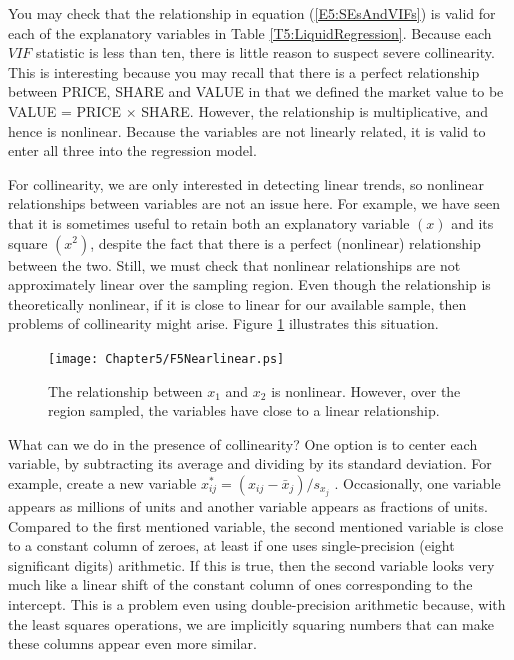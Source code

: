 You may check that the relationship in equation
(\ref{E5:SEsAndVIFs}) is valid for each of the explanatory variables
in Table \ref{T5:LiquidRegression}. Because each $VIF$ statistic is
less than ten, there is little reason to suspect severe
collinearity. This is interesting because you may recall that there
is a perfect relationship between PRICE, SHARE and VALUE in that we
defined the market value to be VALUE = PRICE $\times $ SHARE.
However, the relationship is multiplicative, and hence is nonlinear.
Because the variables are not linearly related, it is valid to enter
all three into the regression model.

\linejed

For collinearity, we are only interested in detecting linear trends,
so nonlinear relationships between variables are not an issue here.
For example, we have seen that it is sometimes useful to retain both
an explanatory variable $(x)$ and its square $(x^2)$, despite the
fact that there is a perfect (nonlinear) relationship between the
two. Still, we must check that nonlinear relationships are not
approximately linear over the sampling region. Even though the
relationship is theoretically nonlinear, if it is close to linear
for our available sample, then problems of collinearity might arise.
Figure \ref{F5:Nearlinear} illustrates this situation.


\begin{figure}[htp]
  \begin{center}
    \texttt{[image: Chapter5/F5Nearlinear.ps]}
    \caption{\label{F5:Nearlinear} \small  The relationship
between $x_1$ and $x_2$ is nonlinear. However, over the region
sampled, the variables have close to a linear relationship.}
  \end{center}
\end{figure}



What can we do in the presence of collinearity? One option is to center each
variable, by subtracting its average and dividing by its standard deviation.
For example, create a new variable $x_{ij}^{\ast }=(x_{ij}-\bar{x}%
_j)/s_{x_j}$ . Occasionally, one variable appears as millions of
units and another variable appears as fractions of units. Compared
to the first mentioned variable, the second mentioned variable is
close to a constant column of zeroes, at least if one uses
single-precision (eight significant digits) arithmetic. If this is
true, then the second variable looks very much like a linear shift
of the constant column of ones corresponding to the intercept. This
is a problem even using double-precision arithmetic because, with
the least squares operations, we are implicitly squaring numbers
that can make these columns appear even more similar.


